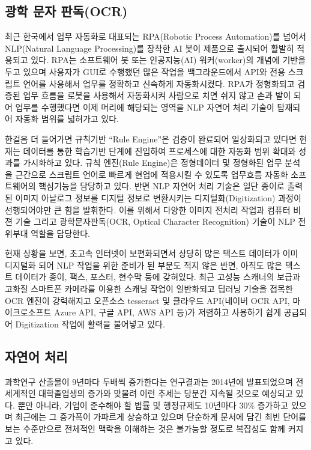 \documentclass[smallextended]{svjour3}       %
\begin{document}
\hypertarget{uxad11uxd559-uxbb38uxc790-uxd310uxb3c5ocr}{%
\subsection{광학 문자
판독(OCR)}\label{uxad11uxd559-uxbb38uxc790-uxd310uxb3c5ocr}}

최근 한국에서 업무 자동화로 대표되는 RPA(Robotic Process Automation)를
넘어서 NLP(Natural Language Processing)를 장착한 AI 봇이 제품으로
출시되어 활발히 적용되고 있다. RPA는 소프트웨어 봇 또는 인공지능(AI)
워커(worker)의 개념에 기반을 두고 있으며 사용자가 GUI로 수행했던 많은
작업을 백그라운드에서 API와 전용 스크립트 언어를 사용해서 업무를
정확하고 신속하게 자동화시켰다. RPA가 정형화되고 검증된 업무 흐름을
로봇을 사용해서 자동화시켜 사람으로 치면 쉬지 않고 손과 발이 되어 업무를
수행했다면 이제 머리에 해당되는 영역을 NLP 자연어 처리 기술이 탑재되어
자동화 범위를 넓혀가고 있다.

한걸음 더 들어가면 규칙기반 ``Rule Engine''은 검증이 완료되어 일상화되고
있다면 현재는 데이터를 통한 학습기반 단계에 진입하여 프로세스에 대한
자동화 범위 확대와 성과를 가시화하고 있다. 규칙 엔진(Rule Engine)은
정형데이터 및 정형화된 업무 분석을 근간으로 스크립트 언어로 빠르게
현업에 적용시킬 수 있도록 업무흐름 자동화 소프트웨어의 핵심기능을
담당하고 있다. 반면 NLP 자연어 처리 기술은 일단 종이로 출력된 이미지
아날로그 정보를 디지털 정보로 변환시키는 디지털화(Digitization) 과정이
선행되어야만 큰 힘을 발휘한다. 이를 위해서 다양한 이미지 전처리 작업과
컴퓨터 비젼 기술 그리고 광학문자판독(OCR, Optical Character Recognition)
기술이 NLP 전위부대 역할을 담당한다.

현재 상황을 보면, 초고속 인터넷이 보편화되면서 상당히 많은 텍스트
데이터가 이미 디지털화 되어 NLP 작업을 위한 준비가 된 부분도 적지 않은
반면, 아직도 많은 텍스트 데이터가 종이, 팩스, 포스터, 현수막 등에
갖혀있다. 최근 고성능 스캐너의 보급과 고화질 스마트폰 카메라를 이용한
스캐닝 작업이 일반화되고 딥러닝 기술을 접목한 OCR 엔진이 강력해지고
오픈소스 tesseract 및 클라우드 API(네이버 OCR API, 마이크로소프트 Azure
API, 구글 API, AWS API 등)가 저렴하고 사용하기 쉽게 공급되어
Digitization 작업에 활력을 불어넣고 있다.

\hypertarget{uxc790uxc5f0uxc5b4-uxcc98uxb9ac}{%
\subsection{자연어 처리}\label{uxc790uxc5f0uxc5b4-uxcc98uxb9ac}}

과학연구 산출물이 9년마다 두배씩 증가한다는 연구결과는 2014년에
발표\cite{van2014global}되었으며 전세계적인 대학졸업생의 증가와 맞물려
이런 추세는 당분간 지속될 것으로 예상되고 있다. 뿐만 아니라, 기업이
준수해야 할 법률 및 행정규제도 10년마다 30\% 증가하고 있으며 최근에는 그
증가폭이 가파르게 상승하고 있으며 단순하게 문서에 담긴 최빈 단어를 보는
수준만으로 전체적인 맥락을 이해하는 것은 불가능할 정도로 복잡성도 함께
커지고 있다.
\end{document}
